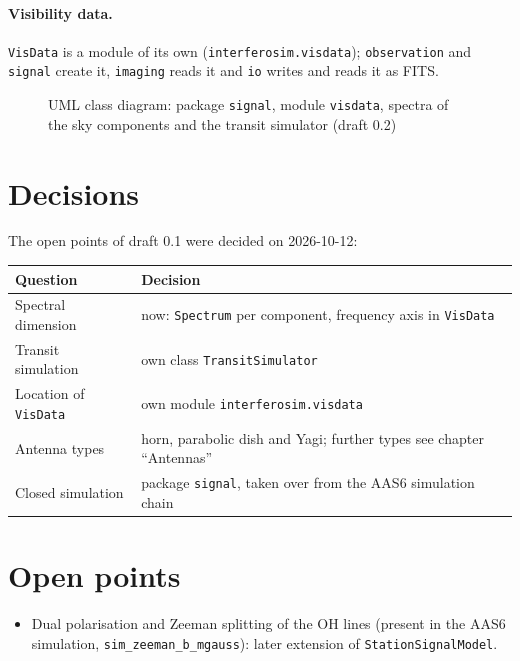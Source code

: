 \paragraph*{Visibility data.} \texttt{VisData} is a module of its own
(\texttt{interferosim.visdata}); \texttt{observation} and
\texttt{signal} create it, \texttt{imaging} reads it and \texttt{io}
writes and reads it as FITS.

\begin{figure}[htbp]
  \centering
  \resizebox{\textwidth}{!}{}
  \caption{UML class diagram: package \texttt{signal}, module
           \texttt{visdata}, spectra of the sky components and the
           transit simulator (draft 0.2)}
  \label{fig:uml-signal}
\end{figure}

\section{Decisions}

The open points of draft 0.1 were decided on 2026-10-12:
\begin{center}
\begin{tabular}{@{}>{\raggedright\arraybackslash}p{4.6cm}>{\raggedright\arraybackslash}p{9.0cm}@{}}
\toprule
Question & Decision \\
\midrule
Spectral dimension & now: \texttt{Spectrum} per component, frequency
  axis in \texttt{VisData} \\
Transit simulation & own class \texttt{TransitSimulator} \\
Location of \texttt{VisData} & own module \texttt{interferosim.visdata} \\
Antenna types & horn, parabolic dish and Yagi; further types see
  chapter \enquote{Antennas} \\
Closed simulation & package \texttt{signal}, taken over from the AAS6
  simulation chain \\
\bottomrule
\end{tabular}
\end{center}

\section{Open points}

\begin{itemize}
  \item Dual polarisation and Zeeman splitting of the OH lines
        (present in the AAS6 simulation, \texttt{sim\_zeeman\_b\_mgauss}):
        later extension of \texttt{StationSignalModel}.
\end{itemize}
